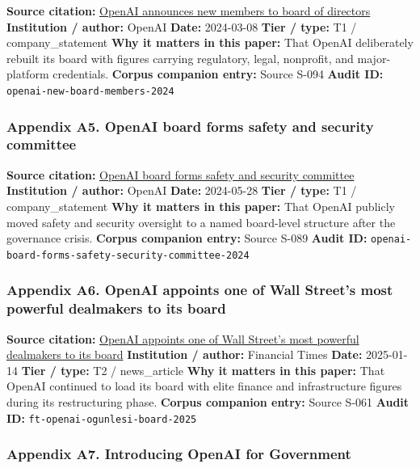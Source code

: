 \documentclass[
  american,
  11pt,
  letterpaper,
]{article}
\begin{document}
\textbf{Source citation:}
\href{https://openai.com/index/openai-announces-new-members-to-board-of-directors/}{OpenAI
announces new members to board of directors} \textbf{Institution /
author:} OpenAI \textbf{Date:} 2024-03-08 \textbf{Tier / type:} T1 /
company\_statement \textbf{Why it matters in this paper:} That OpenAI
deliberately rebuilt its board with figures carrying regulatory, legal,
nonprofit, and major-platform credentials. \textbf{Corpus companion
entry:} Source S-094 \textbf{Audit ID:}
\texttt{openai-new-board-members-2024}

\subsubsection{Appendix A5. OpenAI board forms safety and security
committee}\label{ch-08-appendix-a5-openai-board-forms-safety-and-security-committee}

\textbf{Source citation:}
\href{https://openai.com/index/openai-board-forms-safety-and-security-committee/}{OpenAI
board forms safety and security committee} \textbf{Institution /
author:} OpenAI \textbf{Date:} 2024-05-28 \textbf{Tier / type:} T1 /
company\_statement \textbf{Why it matters in this paper:} That OpenAI
publicly moved safety and security oversight to a named board-level
structure after the governance crisis. \textbf{Corpus companion entry:}
Source S-089 \textbf{Audit ID:}
\texttt{openai-board-forms-safety-security-committee-2024}

\subsubsection{Appendix A6. OpenAI appoints one of Wall Street's most
powerful dealmakers to its
board}\label{ch-08-appendix-a6-openai-appoints-one-of-wall-street-s-most-powerful-dealmakers-to-its-board}

\textbf{Source citation:}
\href{https://www.ft.com/content/63b08a9d-e537-4d60-9904-c59958a16982}{OpenAI
appoints one of Wall Street's most powerful dealmakers to its board}
\textbf{Institution / author:} Financial Times \textbf{Date:} 2025-01-14
\textbf{Tier / type:} T2 / news\_article \textbf{Why it matters in this
paper:} That OpenAI continued to load its board with elite finance and
infrastructure figures during its restructuring phase. \textbf{Corpus
companion entry:} Source S-061 \textbf{Audit ID:}
\texttt{ft-openai-ogunlesi-board-2025}

\subsubsection{Appendix A7. Introducing OpenAI for
Government}\label{ch-08-appendix-a7-introducing-openai-for-government}
\end{document}
